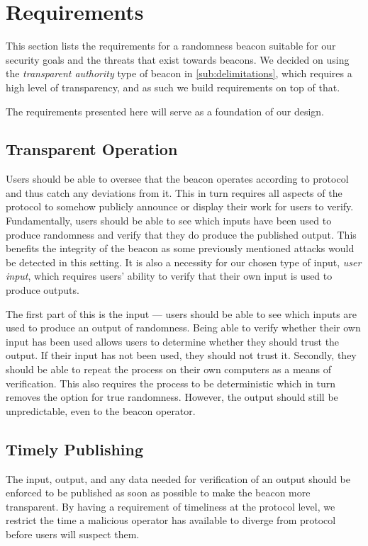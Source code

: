 \section{Requirements}%
\label{sec:beacon_requirements}
This section lists the requirements for a randomness beacon suitable for our security goals and the threats that exist towards beacons.
We decided on using the \emph{transparent authority} type of beacon in \cref{sub:delimitations}, which requires a high level of transparency, and as such we build requirements on top of that.

The requirements presented here will serve as a foundation of our design.

\subsection{Transparent Operation}
Users should be able to oversee that the beacon operates according to protocol and thus catch any deviations from it.
This in turn requires all aspects of the protocol to somehow publicly announce or display their work for users to verify.
Fundamentally, users should be able to see which inputs have been used to produce randomness and verify that they do produce the published output.
This benefits the integrity of the beacon as some previously mentioned attacks would be detected in this setting.
It is also a necessity for our chosen type of input, \emph{user input}, which requires users' ability to verify that their own input is used to produce outputs.

The first part of this is the input --- users should be able to see which inputs are used to produce an output of randomness.
Being able to verify whether their own input has been used allows users to determine whether they should trust the output.
If their input has not been used, they should not trust it.
Secondly, they should be able to repeat the process on their own computers as a means of verification.
This also requires the process to be deterministic which in turn removes the option for true randomness.
However, the output should still be unpredictable, even to the beacon operator.

\subsection{Timely Publishing}
The input, output, and any data needed for verification of an output should be enforced to be published as soon as possible to make the beacon more transparent.
By having a requirement of timeliness at the protocol level, we restrict the time a malicious operator has available to diverge from protocol before users will suspect them.


